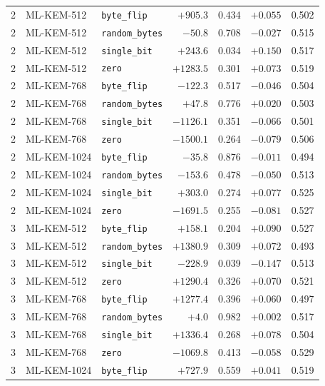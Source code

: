\documentclass[a4paper,fontset=none]{ctexart}
\begin{document}
\begin{longtable}[c]{c>{\raggedright}p{2.2cm}>{\raggedright}p{2.6cm}rrrr}
  \midrule
  2 & ML-KEM-512  & \texttt{byte\_flip}    & $+905.3$   & 0.434 & $+0.055$ & 0.502 \\
  2 & ML-KEM-512  & \texttt{random\_bytes} & $-50.8$    & 0.708 & $-0.027$ & 0.515 \\
  2 & ML-KEM-512  & \texttt{single\_bit}   & $+243.6$   & 0.034 & $+0.150$ & 0.517 \\
  2 & ML-KEM-512  & \texttt{zero}          & $+1283.5$  & 0.301 & $+0.073$ & 0.519 \\
  2 & ML-KEM-768  & \texttt{byte\_flip}    & $-122.3$   & 0.517 & $-0.046$ & 0.504 \\
  2 & ML-KEM-768  & \texttt{random\_bytes} & $+47.8$    & 0.776 & $+0.020$ & 0.503 \\
  2 & ML-KEM-768  & \texttt{single\_bit}   & $-1126.1$  & 0.351 & $-0.066$ & 0.501 \\
  2 & ML-KEM-768  & \texttt{zero}          & $-1500.1$  & 0.264 & $-0.079$ & 0.506 \\
  2 & ML-KEM-1024 & \texttt{byte\_flip}    & $-35.8$    & 0.876 & $-0.011$ & 0.494 \\
  2 & ML-KEM-1024 & \texttt{random\_bytes} & $-153.6$   & 0.478 & $-0.050$ & 0.513 \\
  2 & ML-KEM-1024 & \texttt{single\_bit}   & $+303.0$   & 0.274 & $+0.077$ & 0.525 \\
  2 & ML-KEM-1024 & \texttt{zero}          & $-1691.5$  & 0.255 & $-0.081$ & 0.527 \\
  \midrule
  3 & ML-KEM-512  & \texttt{byte\_flip}    & $+158.1$   & 0.204 & $+0.090$ & 0.527 \\
  3 & ML-KEM-512  & \texttt{random\_bytes} & $+1380.9$  & 0.309 & $+0.072$ & 0.493 \\
  3 & ML-KEM-512  & \texttt{single\_bit}   & $-228.9$   & 0.039 & $-0.147$ & 0.513 \\
  3 & ML-KEM-512  & \texttt{zero}          & $+1290.4$  & 0.326 & $+0.070$ & 0.521 \\
  3 & ML-KEM-768  & \texttt{byte\_flip}    & $+1277.4$  & 0.396 & $+0.060$ & 0.497 \\
  3 & ML-KEM-768  & \texttt{random\_bytes} & $+4.0$     & 0.982 & $+0.002$ & 0.517 \\
  3 & ML-KEM-768  & \texttt{single\_bit}   & $+1336.4$  & 0.268 & $+0.078$ & 0.504 \\
  3 & ML-KEM-768  & \texttt{zero}          & $-1069.8$  & 0.413 & $-0.058$ & 0.529 \\
  3 & ML-KEM-1024 & \texttt{byte\_flip}    & $+727.9$   & 0.559 & $+0.041$ & 0.519 \\

\end{longtable}
\end{document}
